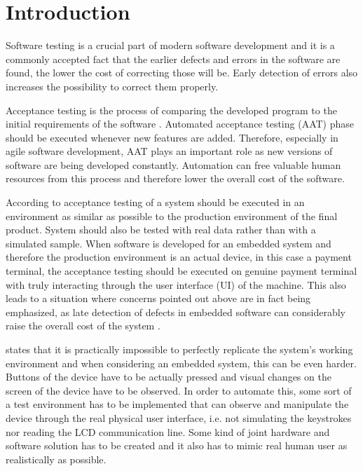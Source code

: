 
\chapter{Introduction}
\label{chapter:intro}

Software testing is a crucial part of modern software development and it is a commonly accepted fact that the earlier defects and errors in the software are found, the lower the cost of correcting those will be. Early detection of errors also increases the possibility to correct them properly. \emph{\citep{myers2011art}}

Acceptance testing is the process of comparing the developed program to the initial requirements of the software \emph{\citep{myers2011art}}. Automated acceptance testing (AAT) phase should be executed whenever new features are added. Therefore, especially in agile software development, AAT plays an important role as new versions of software are being developed constantly. Automation can free valuable human resources from this process \emph{\citep{haugset2008automated}} and therefore lower the overall cost of the software.

According to \emph{\cite{sommerville2011software}} acceptance testing of a system should be executed in an environment as similar as possible to the production environment of the final product. System should also be tested with real data rather than with a simulated sample. When software is developed for an embedded system and therefore the production environment is an actual device, in this case a payment terminal, the acceptance testing should be executed on genuine payment terminal with truly interacting through the user interface (UI) of the machine. This also leads to a situation where concerns pointed out above are in fact being emphasized, as late detection of defects in embedded software can considerably raise the overall cost of the system \emph{\citep{ebert2009embedded}}.

\emph{\cite{sommerville2011software}} states that it is practically impossible to perfectly replicate the system's working environment and when considering an embedded system, this can be even harder. Buttons of the device have to be actually pressed and visual changes on the screen of the device have to be observed. In order to automate this, some sort of a test environment has to be implemented that can observe and manipulate the device through the real physical user interface, i.e. not simulating the keystrokes nor reading the LCD communication line. Some kind of joint hardware and software solution has to be created and it also has to mimic real human user as realistically as possible.

